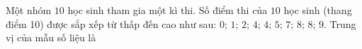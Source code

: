 \begin{ex}
Một nhóm $10$ học sinh tham gia một kì thi. Số điểm thi của $10$ học sinh (thang điểm 10) được sắp xếp từ thấp đến cao như sau: $0$; $1$; $2$; $4$; $4$; $5$; $7$; $8$; $8$; $9$. Trung vị của mẫu số liệu là
\end{ex}
